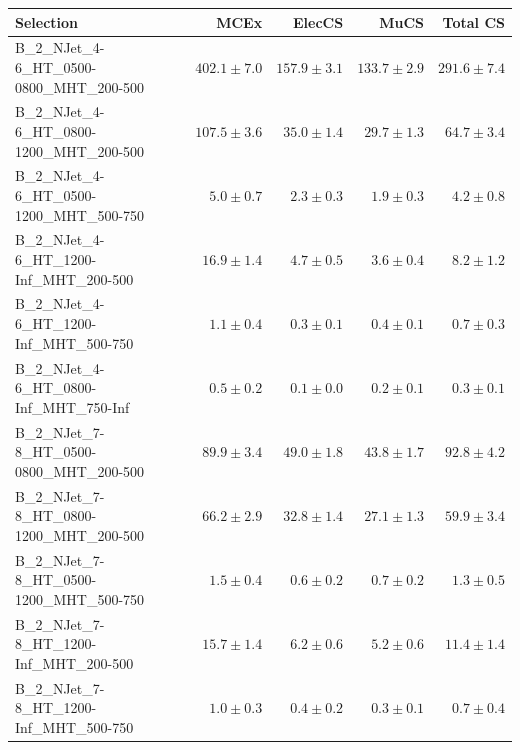\documentclass{beamer}
\begin{document}
\begin{frame}
\tiny
\begin{tabular}{lrrrr}
\toprule

                                                Selection  &          MCEx  &         ElecCS  &                     MuCS  &          Total CS  \\
\midrule
     B\_2\_NJet\_4-6\_HT\_0500-0800\_MHT\_200-500 &             $402.1\pm7.0$&            $157.9\pm3.1$&            $133.7\pm2.9$&                 $291.6\pm7.4$ \\
     B\_2\_NJet\_4-6\_HT\_0800-1200\_MHT\_200-500 &             $107.5\pm3.6$&             $35.0\pm1.4$&             $29.7\pm1.3$&                  $64.7\pm3.4$ \\
     B\_2\_NJet\_4-6\_HT\_0500-1200\_MHT\_500-750 &               $5.0\pm0.7$&              $2.3\pm0.3$&              $1.9\pm0.3$&                   $4.2\pm0.8$ \\
      B\_2\_NJet\_4-6\_HT\_1200-Inf\_MHT\_200-500 &              $16.9\pm1.4$&              $4.7\pm0.5$&              $3.6\pm0.4$&                   $8.2\pm1.2$ \\
      B\_2\_NJet\_4-6\_HT\_1200-Inf\_MHT\_500-750 &               $1.1\pm0.4$&              $0.3\pm0.1$&              $0.4\pm0.1$&                   $0.7\pm0.3$ \\
      B\_2\_NJet\_4-6\_HT\_0800-Inf\_MHT\_750-Inf &               $0.5\pm0.2$&              $0.1\pm0.0$&              $0.2\pm0.1$&                   $0.3\pm0.1$ \\
     B\_2\_NJet\_7-8\_HT\_0500-0800\_MHT\_200-500 &              $89.9\pm3.4$&             $49.0\pm1.8$&             $43.8\pm1.7$&                  $92.8\pm4.2$ \\
     B\_2\_NJet\_7-8\_HT\_0800-1200\_MHT\_200-500 &              $66.2\pm2.9$&             $32.8\pm1.4$&             $27.1\pm1.3$&                  $59.9\pm3.4$ \\
     B\_2\_NJet\_7-8\_HT\_0500-1200\_MHT\_500-750 &               $1.5\pm0.4$&              $0.6\pm0.2$&              $0.7\pm0.2$&                   $1.3\pm0.5$ \\
      B\_2\_NJet\_7-8\_HT\_1200-Inf\_MHT\_200-500 &              $15.7\pm1.4$&              $6.2\pm0.6$&              $5.2\pm0.6$&                  $11.4\pm1.4$ \\
      B\_2\_NJet\_7-8\_HT\_1200-Inf\_MHT\_500-750 &               $1.0\pm0.3$&              $0.4\pm0.2$&              $0.3\pm0.1$&                   $0.7\pm0.4$ \\

\end{tabular}
\end{frame}
\end{document}
